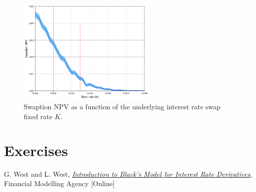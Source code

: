 \begin{figure}[htb]
\centering
\includegraphics[width=0.6\textwidth]{figures/swaption_npv_vs_K}
\caption{Swaption NPV as a function of the underlying interest rate swap fixed rate $K$.}
\label{fig:swaption_npv_vs_K}
\end{figure}


%

\newpage
\section*{Exercises}


\begin{thebibliography}{9}
 G. West and L. West, \href{http://janroman.dhis.org/finance/Black/IntroToBlack.pdf}{\emph{Introduction to Black's Model for Interest Rate Derivatives}}, Financial Modelling Agency [Online]
\end{thebibliography}